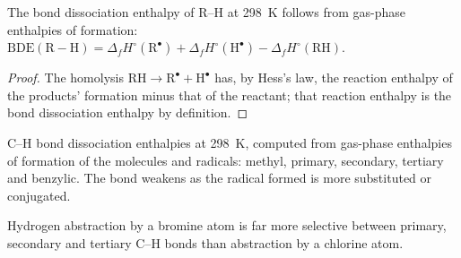 \begin{proposition}\label{prop:b3:radicals-carbenes:bde}
The bond dissociation enthalpy of R--H at \qty{298}{K} follows from gas-phase enthalpies
of formation: $\mathrm{BDE(R{-}H)} = \Delta_fH^\circ(\mathrm R^\bullet) + \Delta_fH^\circ(\mathrm H^\bullet) - \Delta_fH^\circ(\mathrm{RH})$.
\end{proposition}

\begin{proof}
The homolysis $\mathrm{RH \to R^\bullet + H^\bullet}$ has, by Hess's law, the reaction enthalpy of the products'
formation minus that of the reactant; that reaction enthalpy is the bond
dissociation enthalpy by definition.
\end{proof}

\begin{omfigure}

{\small C--H bond dissociation enthalpies at \qty{298}{K}, computed from gas-phase
enthalpies of formation of the molecules and radicals: methyl, primary,
secondary, tertiary and benzylic. The bond weakens as the radical formed is
more substituted or conjugated.}
\end{omfigure}

\begin{proposition}\label{prop:b3:radicals-carbenes:halogenation-selectivity}
Hydrogen abstraction by a bromine atom is far more selective between primary,
secondary and tertiary C--H bonds than abstraction by a chlorine atom.
\end{proposition}

